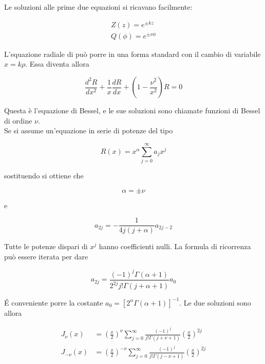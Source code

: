 Le soluzioni alle prime due equazioni si ricavano facilmente:

\begin{align}
    Z(z) = e^{\pm kz}\\
    Q(\phi) = e^{\pm \nu \phi}
\end{align}

L'equazione radiale di può porre in una forma standard con il cambio di variabile $x = k\rho$. Essa diventa allora 

\begin{tcolorbox}[colback=yellow!10!white, colframe=orange!70!black, boxrule=0.8pt]
\begin{equation} \label{eq: equazione_Bessel}
    \frac{d^2 R}{dx^2} + \frac{1}{x} \frac{dR}{dx} + \left( 1 - \frac{\nu^2}{x^2} \right) R = 0
\end{equation}
\end{tcolorbox}

Questa è l'equazione di Bessel, e le sue soluzioni sono chiamate funzioni di Bessel di ordine $\nu$.\\

Se si assume un'equazione in serie di potenze del tipo 

\begin{equation}
    R(x) = x^{\alpha} \sum_{j = 0}^{\infty} a_j x^{j}
\end{equation}

sostituendo si ottiene che 

\begin{equation}
    \alpha = \pm \nu
\end{equation}

e 

\begin{equation}
    a_{2j} = - \frac{1}{4j (j + \alpha)} a_{2j-2}
\end{equation}

Tutte le potenze dispari di $x^j$ hanno coefficienti nulli. La formula di ricorrenza può essere iterata per dare 

\begin{equation}
a_{2 j}=\frac{(-1)^j \Gamma(\alpha+1)}{2^{2 j} j!\Gamma(j+\alpha+1)} a_0
\end{equation}

\'E conveniente porre la costante $a_0 = [2^\alpha \Gamma(\alpha +1)]^{-1}$. Le due soluzioni sono allora 

\begin{tcolorbox}[colback=yellow!10!white, colframe=orange!70!black, boxrule=0.8pt]
\begin{equation}
\begin{aligned}
J_\nu(x) & =\left(\frac{x}{2}\right)^\nu \sum_{j=0}^{\infty} \frac{(-1)^j}{j!\Gamma(j+\nu+1)}\left(\frac{x}{2}\right)^{2 j} \\
J_{-\nu}(x) & =\left(\frac{x}{2}\right)^{-\nu} \sum_{j=0}^{\infty} \frac{(-1)^j}{j!\Gamma(j-\nu+1)}\left(\frac{x}{2}\right)^{2 j}
\end{aligned}
\end{equation}
\end{tcolorbox}

